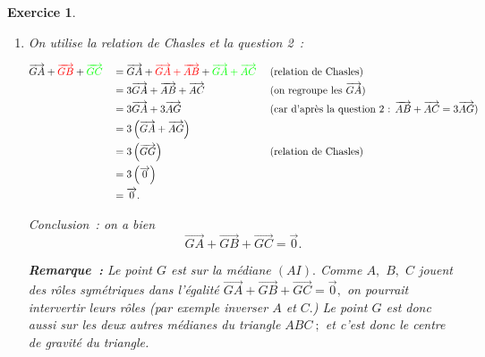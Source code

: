\documentclass[10pt]{article}
\newtheorem{exo}{Exercice}
\begin{document}
\begin{exo}
\begin{enumerate}
\item On utilise la relation de Chasles et la question 2~:

\begin{alignat*}{3}
&\overrightarrow{GA}+\textcolor{red}{\overrightarrow{GB}}+\textcolor{green}{\overrightarrow{GC}}&& =\overrightarrow{GA}+\textcolor{red}{\overrightarrow{GA}+\overrightarrow{AB}}+\textcolor{green}{\overrightarrow{GA}+\overrightarrow{AC}} && \text{  (relation de Chasles)}\\
& && =3\overrightarrow{GA}+\overrightarrow{AB}+\overrightarrow{AC} && \text{ (on regroupe les } \overrightarrow{GA})\\
& && =3\overrightarrow{GA}+3\overrightarrow{AG}&& \text{  (car d'après la question 2 : } \overrightarrow{AB}+\overrightarrow{AC}=3\overrightarrow{AG})\\
& && =3\left(\overrightarrow{GA}+\overrightarrow{AG}\right)&&\\
& && =3\left(\overrightarrow{GG}\right)&& \text{  (relation de Chasles)}\\
& && =3\left(\overrightarrow{0}\right)&&\\
& && =\overrightarrow{0}.&&\\
\end{alignat*}

Conclusion~: on a bien \[\overrightarrow{GA}+\overrightarrow{GB}+\overrightarrow{GC}=\overrightarrow{0}.\]

\medskip

\textbf{Remarque~:} Le point $G$ est sur la médiane $(AI).$ Comme $A,$ $B,$ $C$ jouent des rôles symétriques dans l'égalité $\overrightarrow{GA}+\overrightarrow{GB}+\overrightarrow{GC}=\overrightarrow{0},$ on pourrait intervertir leurs rôles (par exemple inverser $A$ et $C.$) Le point $G$ est donc aussi sur les deux autres médianes du triangle $ABC~;$ et c'est donc le centre de gravité du triangle. 
\end{enumerate}

\end{exo}
\end{document}
